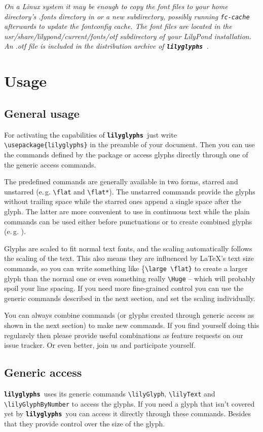\documentclass{article}
\newcommand{\lilyglyphs}{\texttt{\textbf{lilyglyphs\,}}}
\newcommand*{\cmd}[1]{\texttt{\textbackslash #1}}
\begin{document}
\textit{On a Linux system it may be enough to copy the font files to your home directory's .fonts directory in or a new subdirectory, possibly running \texttt{fc-cache} afterwards to update the fontconfig cache. The font files are located in the usr/share/lilypond/current/fonts/otf subdirectory of your LilyPond installation. An .otf file is included in the distribution archive of \lilyglyphs.}



\section{Usage}
\subsection{General usage}
For activating the capabilities of \lilyglyphs just write \cmd{usepackage\{lilyglyphs\}} in the preamble of your document. Then you can use the commands defined by the package or access glyphs directly through one of the generic access commands.

The predefined commands are generally available in two forms, starred and unstarred (e.\,g. \cmd{flat} and \cmd{flat*}). The unstarred commands provide the glyphs without trailing space while the starred ones append a single space after the glyph. The latter are more convenient to use in continuous text while the plain commands can be used either before punctuations or to create combined glyphs (e.\,g. ).

Glyphs are scaled to fit normal text fonts, and the scaling automatically follows the scaling of the text. This also means they are influenced by \LaTeX 's text size commands, so you can write something like \{\cmd{large \textbackslash flat\}} to create a larger {\large \flat} glyph than the normal \flat* one or even something really \cmd{Huge} {\Huge {}} -- which will probably spoil your line spacing. If you need more fine-grained control you can use the generic commands described in the next section, and set the scaling individually.

You can always combine commands (or glyphs created through generic access as shown in the next section) to make new commands. If you find yourself doing this regularely then please provide useful combinations as feature requests on our issue tracker. Or even better, join us and participate yourself.



\subsection{Generic access}
\lilyglyphs uses its generic commands \cmd{lilyGlyph}, \cmd{lilyText} and \cmd{lilyGlyphByNumber} to access the glyphs. If you need a glyph that isn't covered yet by \lilyglyphs you can access it directly through these commands. Besides that they provide control over the size of the glyph.
\end{document}
